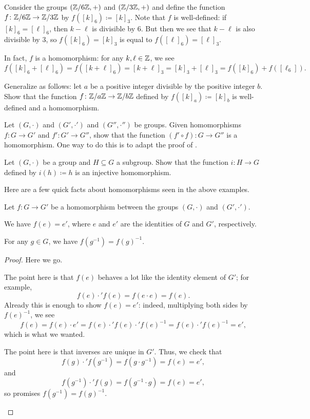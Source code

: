 \documentclass[../main.tex]{subfiles}
\begin{document}
\begin{example} \label{ex:z6z-to-z3z}
    Consider the groups $(\mathbb Z/6\mathbb Z,+)$ and $(\mathbb Z/3\mathbb Z,+)$ and define the function $f\colon\mathbb Z/6\mathbb Z\to\mathbb Z/3\mathbb Z$ by $f([k]_6)\coloneqq[k]_3$. Note that $f$ is well-defined: if $[k]_6=[\ell]_6$, then $k-\ell$ is divisible by $6$. But then we see that $k-\ell$ is also divisible by $3$, so $f([k]_6)=[k]_3$ is equal to $f([\ell]_6)=[\ell]_3$.
    
    In fact, $f$ is a homomorphism: for any $k,\ell\in\mathbb Z$, we see
    \[f([k]_6+[\ell]_6)=f([k+\ell]_6)=[k+\ell]_3=[k]_3+[\ell]_3=f([k]_6)+f([\ell_6]).\]
\end{example}
\begin{exe}
    Generalize  as follows: let $a$ be a positive integer divisible by the positive integer $b$. Show that the function $f\colon\mathbb Z/a\mathbb Z\to\mathbb Z/b\mathbb Z$ defined by $f([k]_a)\coloneqq[k]_b$ is well-defined and a homomorphism.
\end{exe}
\begin{exe}
    Let $(G,\cdot)$ and $(G',\cdot')$ and $(G'',\cdot'')$ be groups. Given homomorphisms $f\colon G\to G'$ and $f'\colon G'\to G''$, show that the function $(f'\circ f)\colon G\to G''$ is a homomorphism. One way to do this is to adapt the proof of .
\end{exe}
\begin{exe} \label{exe:subgroup-hom}
    Let $(G,\cdot)$ be a group and $H\subseteq G$ a subgroup. Show that the function $i\colon H\to G$ defined by $i(h)\coloneqq h$ is an injective homomorphism.
\end{exe}
Here are a few quick facts about homomorphisms seen in the above examples.
\begin{lemma} \label{lem:basic-hom}
    Let $f\colon G\to G'$ be a homomorphism between the groups $(G,\cdot)$ and $(G',\cdot')$.
    \begin{listalph}
        \item We have $f(e)=e'$, where $e$ and $e'$ are the identities of $G$ and $G'$, respectively.
        \item For any $g\in G$, we have $f\left(g^{-1}\right)=f(g)^{-1}$.
    \end{listalph}
\end{lemma}
\begin{proof}
    Here we go.
    \begin{listalph}
        \item The point here is that $f(e)$ behaves a lot like the identity element of $G'$; for example,
        \[f(e)\cdot'f(e)=f(e\cdot e)=f(e).\]
        Already this is enough to show $f(e)=e'$: indeed, multiplying both sides by $f(e)^{-1}$, we see
        \[f(e)=f(e)\cdot e'=f(e)\cdot'f(e)\cdot'f(e)^{-1}=f(e)\cdot'f(e)^{-1}=e',\]
        which is what we wanted.
        \item The point here is that inverses are unique in $G'$. Thus, we check that
        \[f(g)\cdot'f\left(g^{-1}\right)=f\left(g\cdot g^{-1}\right)=f(e)=e',\]
        and
        \[f\left(g^{-1}\right)\cdot'f(g)=f\left(g^{-1}\cdot g\right)=f(e)=e',\]
        so  promises $f\left(g^{-1}\right)=f(g)^{-1}$.
        \qedhere
    \end{listalph}
\end{proof}
\end{document}
